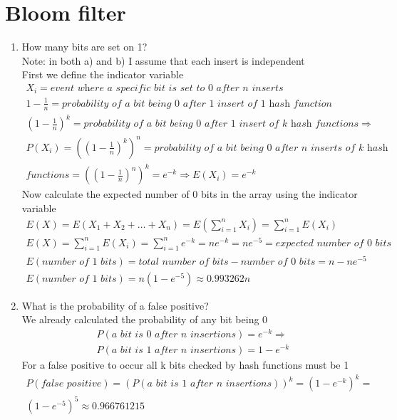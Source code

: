 \documentclass[12pt]{article}
\begin{document}
\section{Bloom filter}
\begin{enumerate}[label=\alph*)]
\item How many bits are set on 1?\\
	Note: in both a) and b) I assume that each insert is independent\\
	First we define the indicator variable
	\begin{gather*}
	X_i = \textit{event where a specific bit is set to 0 after n inserts} \\
	1 - \frac{1}{n} = \textit{probability of a bit being 0 after 1 insert of 1 hash function}\\
	(1 - \frac{1}{n})^k = \textit{probability of a bit being 0 after 1 insert of k hash functions}\Rightarrow\\
	P(X_i) = ((1 - \frac{1}{n})^k)^n = \textit{probability of a bit being 0 after n inserts of k hash}\\
	\textit{functions} = ((1 - \frac{1}{n})^n)^k = e^{-k} \Rightarrow E(X_i) = e^{-k}
	\end{gather*}
	Now calculate the expected number of 0 bits in the array using the indicator variable
	\begin{gather*}
		E(X) = E(X_1 + X_2 + \dots + X_n) = E(\sum_{i=1}^{n}{X_i}) = \sum_{i=1}^{n}{E(X_i)}\\
		E(X) = \sum_{i=1}^{n}{E(X_i)} = \sum_{i=1}^{n}{e^{-k}} = ne^{-k} = ne^{-5} = \textit{expected number of 0 bits}\\
		E(\textit{number of 1 bits}) = \textit{total number of bits} - \textit{number of 0 bits} = n - ne^{-5}\\
		E(\textit{number of 1 bits}) = n(1 - e^{-5}) \approx 0.993262n
	\end{gather*}

\item What is the probability of a false positive?\\
	We already calculated the probability of any bit being 0
	\begin{gather*}
	P(\textit{a bit is 0 after n insertions}) = e^{-k} \Rightarrow\\
	P(\textit{a bit is 1 after n insertions}) = 1 - e^{-k}
	\end{gather*}
	For a false positive to occur all k bits checked by hash functions must be 1
	\begin{gather*}
	P(\textit{false positive}) = (P(\textit{a bit is 1 after n insertions}))^k = (1 - e^{-k})^k =\\
	(1 - e^{-5})^5 \approx 0.966761215
	\end{gather*}
\end{enumerate}
\end{document}
